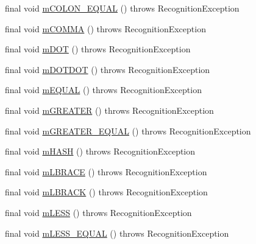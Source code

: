 \begin{DoxyCompactItemize}
\item 
final void \hyperlink{classorg_1_1tzi_1_1use_1_1parser_1_1shell_1_1_shell_command_lexer_a9ae19648add40cbc966a176612a06834}{m\-C\-O\-L\-O\-N\-\_\-\-E\-Q\-U\-A\-L} ()  throws Recognition\-Exception 
\item 
final void \hyperlink{classorg_1_1tzi_1_1use_1_1parser_1_1shell_1_1_shell_command_lexer_a50716e3b135239758f1f40d7c526a585}{m\-C\-O\-M\-M\-A} ()  throws Recognition\-Exception 
\item 
final void \hyperlink{classorg_1_1tzi_1_1use_1_1parser_1_1shell_1_1_shell_command_lexer_ae542ac9ae8b59931ca8f2ca3e79f1964}{m\-D\-O\-T} ()  throws Recognition\-Exception 
\item 
final void \hyperlink{classorg_1_1tzi_1_1use_1_1parser_1_1shell_1_1_shell_command_lexer_af2052321fa3fe0c2dc23df52b65ba7a7}{m\-D\-O\-T\-D\-O\-T} ()  throws Recognition\-Exception 
\item 
final void \hyperlink{classorg_1_1tzi_1_1use_1_1parser_1_1shell_1_1_shell_command_lexer_a751c8b948de94468534e11ea4593ab51}{m\-E\-Q\-U\-A\-L} ()  throws Recognition\-Exception 
\item 
final void \hyperlink{classorg_1_1tzi_1_1use_1_1parser_1_1shell_1_1_shell_command_lexer_afb5621de7394a5fd806600823f66ea42}{m\-G\-R\-E\-A\-T\-E\-R} ()  throws Recognition\-Exception 
\item 
final void \hyperlink{classorg_1_1tzi_1_1use_1_1parser_1_1shell_1_1_shell_command_lexer_a643ba6f8371dc356e1c4d4b97e2944d5}{m\-G\-R\-E\-A\-T\-E\-R\-\_\-\-E\-Q\-U\-A\-L} ()  throws Recognition\-Exception 
\item 
final void \hyperlink{classorg_1_1tzi_1_1use_1_1parser_1_1shell_1_1_shell_command_lexer_ac43f42fe39cf18c89d4f9ac6b7ed59fb}{m\-H\-A\-S\-H} ()  throws Recognition\-Exception 
\item 
final void \hyperlink{classorg_1_1tzi_1_1use_1_1parser_1_1shell_1_1_shell_command_lexer_ac39f0b9b7c118ae88645a3fc83a487c4}{m\-L\-B\-R\-A\-C\-E} ()  throws Recognition\-Exception 
\item 
final void \hyperlink{classorg_1_1tzi_1_1use_1_1parser_1_1shell_1_1_shell_command_lexer_a35c8b017b005b8369ebd8c67238126fa}{m\-L\-B\-R\-A\-C\-K} ()  throws Recognition\-Exception 
\item 
final void \hyperlink{classorg_1_1tzi_1_1use_1_1parser_1_1shell_1_1_shell_command_lexer_a9e990ff0f47a1a9308b99b04635d7280}{m\-L\-E\-S\-S} ()  throws Recognition\-Exception 
\item 
final void \hyperlink{classorg_1_1tzi_1_1use_1_1parser_1_1shell_1_1_shell_command_lexer_abd66467b9c2405fb96b8cd0ce7236e7f}{m\-L\-E\-S\-S\-\_\-\-E\-Q\-U\-A\-L} ()  throws Recognition\-Exception 

\end{DoxyCompactItemize}
